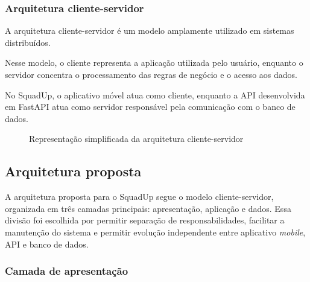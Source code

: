 \documentclass[a4paper, 12pt]{article}
\begin{document}
\begin{justify}
\subsubsection{Arquitetura cliente-servidor}

A arquitetura cliente-servidor é um modelo amplamente utilizado em sistemas distribuídos.

Nesse modelo, o cliente representa a aplicação utilizada pelo usuário, enquanto o servidor concentra o processamento das regras de negócio e o acesso aos dados.

No SquadUp, o aplicativo móvel atua como cliente, enquanto a API desenvolvida em FastAPI atua como servidor responsável pela comunicação com o banco de dados.

\begin{figure}[H]
    \centering
    \caption{Representação simplificada da arquitetura cliente-servidor}
    \label{fig:cliente_servidor}
\end{figure}

\subsection{Arquitetura proposta}

A arquitetura proposta para o SquadUp segue o modelo cliente-servidor, organizada em três camadas principais: apresentação, aplicação e dados. Essa divisão foi escolhida por permitir separação de responsabilidades, facilitar a manutenção do sistema e permitir evolução independente entre aplicativo \textit{mobile}, API e banco de dados.


\subsubsection{Camada de apresentação}


\end{justify}
\end{document}
